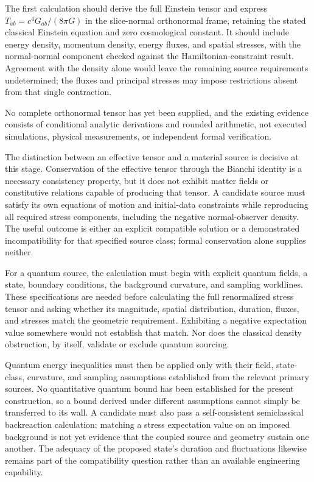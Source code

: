 \documentclass[11pt]{article}
\begin{document}
The first calculation should derive the full Einstein tensor and express $T_{ab}=c^{4}G_{ab}/(8\pi G)$ in the slice-normal orthonormal frame, retaining the stated classical Einstein equation and zero cosmological constant. It should include energy density, momentum density, energy fluxes, and spatial stresses, with the normal-normal component checked against the Hamiltonian-constraint result. Agreement with the density alone would leave the remaining source requirements undetermined; the fluxes and principal stresses may impose restrictions absent from that single contraction.

No complete orthonormal tensor has yet been supplied, and the existing evidence consists of conditional analytic derivations and rounded arithmetic, not executed simulations, physical measurements, or independent formal verification.

The distinction between an effective tensor and a material source is decisive at this stage. Conservation of the effective tensor through the Bianchi identity is a necessary consistency property, but it does not exhibit matter fields or constitutive relations capable of producing that tensor. A candidate source must satisfy its own equations of motion and initial-data constraints while reproducing all required stress components, including the negative normal-observer density. The useful outcome is either an explicit compatible solution or a demonstrated incompatibility for that specified source class; formal conservation alone supplies neither.

For a quantum source, the calculation must begin with explicit quantum fields, a state, boundary conditions, the background curvature, and sampling worldlines. These specifications are needed before calculating the full renormalized stress tensor and asking whether its magnitude, spatial distribution, duration, fluxes, and stresses match the geometric requirement. Exhibiting a negative expectation value somewhere would not establish that match. Nor does the classical density obstruction, by itself, validate or exclude quantum sourcing.

Quantum energy inequalities must then be applied only with their field, state-class, curvature, and sampling assumptions established from the relevant primary sources. No quantitative quantum bound has been established for the present construction, so a bound derived under different assumptions cannot simply be transferred to its wall. A candidate must also pass a self-consistent semiclassical backreaction calculation: matching a stress expectation value on an imposed background is not yet evidence that the coupled source and geometry sustain one another. The adequacy of the proposed state’s duration and fluctuations likewise remains part of the compatibility question rather than an available engineering capability.
\end{document}
